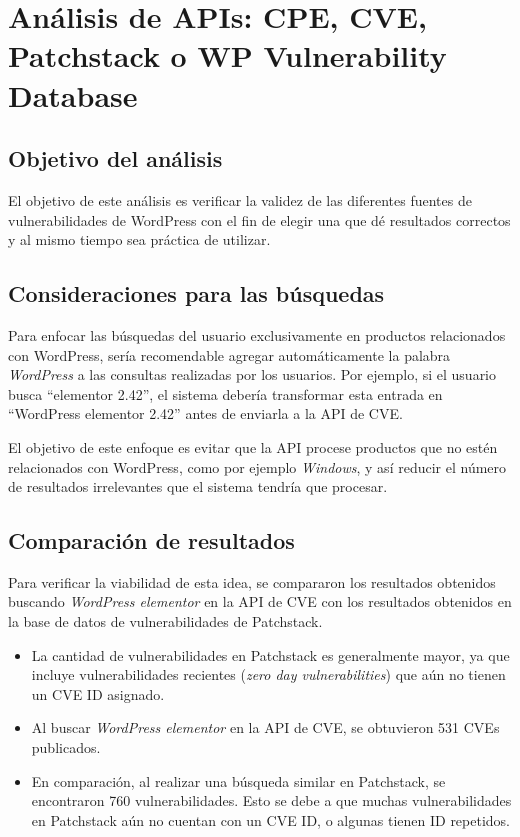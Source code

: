 
\section{Análisis de APIs: CPE, CVE, Patchstack o WP Vulnerability Database}

\subsection*{Objetivo del análisis}
El objetivo de este análisis es verificar la validez de las diferentes fuentes de vulnerabilidades de WordPress con el fin de elegir una que dé resultados correctos y al mismo tiempo sea práctica de utilizar.

\subsection*{Consideraciones para las búsquedas}
Para enfocar las búsquedas del usuario exclusivamente en productos relacionados con WordPress, sería recomendable agregar automáticamente la palabra \textit{WordPress} a las consultas realizadas por los usuarios. Por ejemplo, si el usuario busca “elementor 2.42”, el sistema debería transformar esta entrada en “WordPress elementor 2.42” antes de enviarla a la API de CVE.

El objetivo de este enfoque es evitar que la API procese productos que no estén relacionados con WordPress, como por ejemplo \textit{Windows}, y así reducir el número de resultados irrelevantes que el sistema tendría que procesar.

\subsection*{Comparación de resultados}
Para verificar la viabilidad de esta idea, se compararon los resultados obtenidos buscando \textit{WordPress elementor} en la API de CVE con los resultados obtenidos en la base de datos de vulnerabilidades de Patchstack.

\begin{itemize}
    \item La cantidad de vulnerabilidades en Patchstack es generalmente mayor, ya que incluye vulnerabilidades recientes (\textit{zero day vulnerabilities}) que aún no tienen un CVE ID asignado.
    \item Al buscar \textit{WordPress elementor} en la API de CVE, se obtuvieron 531 CVEs publicados.
    \item En comparación, al realizar una búsqueda similar en Patchstack, se encontraron 760 vulnerabilidades. Esto se debe a que muchas vulnerabilidades en Patchstack aún no cuentan con un CVE ID, o algunas tienen ID repetidos.
\end{itemize}

